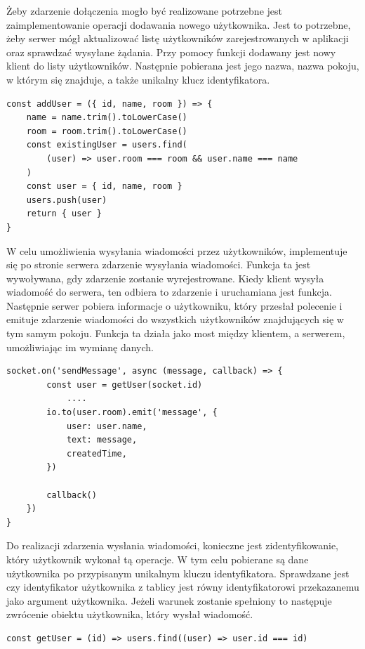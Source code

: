 Żeby zdarzenie dołączenia mogło być realizowane potrzebne jest zaimplementowanie operacji dodawania nowego użytkownika. Jest to potrzebne, żeby serwer mógł aktualizować listę użytkowników zarejestrowanych w aplikacji oraz sprawdzać wysyłane żądania. Przy pomocy funkcji dodawany jest nowy klient do listy użytkowników. Następnie pobierana jest jego nazwa, nazwa pokoju, w którym się znajduje, a także unikalny klucz identyfikatora.
\begin{lstlisting}[caption=Implementacja funkcji dodawania użytkownika]
const addUser = ({ id, name, room }) => {
    name = name.trim().toLowerCase()
    room = room.trim().toLowerCase()
    const existingUser = users.find(
        (user) => user.room === room && user.name === name
    )
    const user = { id, name, room }
    users.push(user)
    return { user }
}
\end{lstlisting}
W celu umożliwienia wysyłania wiadomości przez użytkowników, implementuje się po stronie serwera zdarzenie wysyłania wiadomości. Funkcja ta jest wywoływana, gdy zdarzenie zostanie wyrejestrowane. Kiedy klient wysyła wiadomość do serwera, ten odbiera to zdarzenie i uruchamiana jest funkcja. Następnie serwer pobiera informacje o użytkowniku, który przesłał polecenie i emituje zdarzenie wiadomości do wszystkich użytkowników znajdujących się w tym samym pokoju. Funkcja ta działa jako most między klientem, a serwerem, umożliwiając im wymianę danych.
\begin{lstlisting}[caption=Implementacja zdarzenia wysyłania wiadomości]
socket.on('sendMessage', async (message, callback) => {
        const user = getUser(socket.id)
        	....
        io.to(user.room).emit('message', {
            user: user.name,
            text: message,
            createdTime,
        })

        callback()
    })
}
\end{lstlisting}
Do realizacji zdarzenia wysłania wiadomości, konieczne jest zidentyfikowanie, który użytkownik wykonał tą operacje. W tym celu pobierane są dane użytkownika po przypisanym unikalnym kluczu identyfikatora. Sprawdzane jest czy identyfikator użytkownika z tablicy jest równy identyfikatorowi przekazanemu jako argument użytkownika. Jeżeli warunek zostanie spełniony to następuje zwrócenie obiektu użytkownika, który wysłał wiadomość.
\begin{lstlisting}[caption=Implementacja funkcji pobierania informacji o użytkowniku]
const getUser = (id) => users.find((user) => user.id === id)
\end{lstlisting}

